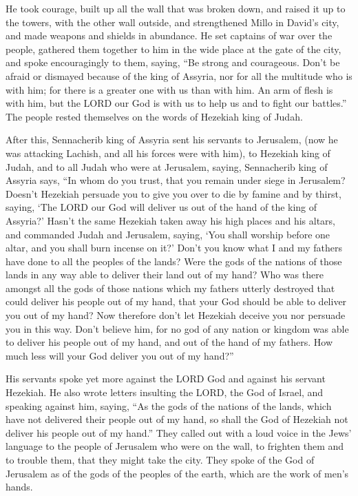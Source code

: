  He took courage, built up all the wall that was broken
down, and raised it up to the towers, with the other wall outside, and
strengthened Millo in David's city, and made weapons and shields in
abundance.  He set captains of war over the people, gathered
them together to him in the wide place at the gate of the city, and
spoke encouragingly to them, saying,  ``Be strong and
courageous. Don't be afraid or dismayed because of the king of Assyria,
nor for all the multitude who is with him; for there is a greater one
with us than with him.  An arm of flesh is with him, but the
LORD our God is with us to help us and to fight our battles.'' The
people rested themselves on the words of Hezekiah king of Judah.

 After this, Sennacherib king of Assyria sent his servants
to Jerusalem, (now he was attacking Lachish, and all his forces were
with him), to Hezekiah king of Judah, and to all Judah who were at
Jerusalem, saying,  Sennacherib king of Assyria says, ``In
whom do you trust, that you remain under siege in Jerusalem?
 Doesn't Hezekiah persuade you to give you over to die by
famine and by thirst, saying, `The LORD our God will deliver us out of
the hand of the king of Assyria?'  Hasn't the same Hezekiah
taken away his high places and his altars, and commanded Judah and
Jerusalem, saying, `You shall worship before one altar, and you shall
burn incense on it?'  Don't you know what I and my fathers
have done to all the peoples of the lands? Were the gods of the nations
of those lands in any way able to deliver their land out of my hand?
 Who was there amongst all the gods of those nations which
my fathers utterly destroyed that could deliver his people out of my
hand, that your God should be able to deliver you out of my hand?
 Now therefore don't let Hezekiah deceive you nor persuade
you in this way. Don't believe him, for no god of any nation or kingdom
was able to deliver his people out of my hand, and out of the hand of my
fathers. How much less will your God deliver you out of my hand?''

 His servants spoke yet more against the LORD God and
against his servant Hezekiah.  He also wrote letters
insulting the LORD, the God of Israel, and speaking against him, saying,
``As the gods of the nations of the lands, which have not delivered
their people out of my hand, so shall the God of Hezekiah not deliver
his people out of my hand.''  They called out with a loud
voice in the Jews' language to the people of Jerusalem who were on the
wall, to frighten them and to trouble them, that they might take the
city.  They spoke of the God of Jerusalem as of the gods of
the peoples of the earth, which are the work of men's hands.

